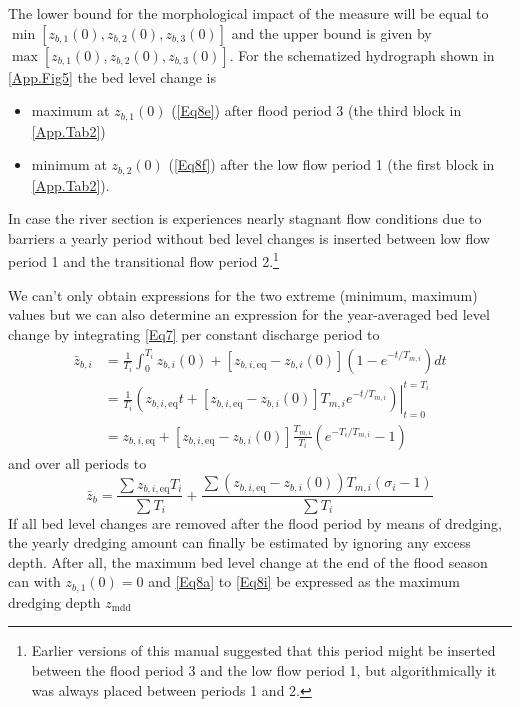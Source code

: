 The lower bound for the morphological impact of the measure will be equal to $\min[z_{b,1}(0), z_{b,2}(0), z_{b,3}(0)]$ and the upper bound is given by $\max[z_{b,1}(0), z_{b,2}(0), z_{b,3}(0)]$.
For the schematized hydrograph shown in \autoref{App.Fig5} the bed level change is

\begin{itemize}
\item maximum at $z_{b,1}(0)$ (\autoref{Eq8e}) after flood period 3 (the third block in \autoref{App.Tab2})
\item minimum at $z_{b,2}(0)$ (\autoref{Eq8f}) after the low flow period 1 (the first block in \autoref{App.Tab2}).
\end{itemize}

In case the river section is experiences nearly stagnant flow conditions due to barriers a yearly period without bed level changes is inserted between low flow period 1 and the transitional flow period 2.\footnote{Earlier versions of this manual suggested that this period might be inserted between the flood period 3 and the low flow period 1, but algorithmically it was always placed between periods 1 and 2.}

We can't only obtain expressions for the two extreme (minimum, maximum) values but we can also determine an expression for the year-averaged bed level change by integrating \autoref{Eq7} per constant discharge period to
%
\begin{align}
\bar{z}_{b,i} &= \frac{1}{T_i} \int_0^{T_i}{z_{b,i} (0) + [z_{b,i,\text{eq}} - z_{b,i}(0)](1 - e^{-t/T_{m,i}})}dt \\
&= \frac{1}{T_i} \left . \left ( {z_{b,i,\text{eq}} t + [z_{b,i,\text{eq}} - z_{b,i}(0)]T_{m,i} e^{-t/T_{m,i}}} \right ) \right |_{t=0}^{t=T_i} \\
&= z_{b,i,\text{eq}} + [z_{b,i,\text{eq}} - z_{b,i}(0)] \frac{T_{m,i}}{T_i} ( e^{-T_i/T_{m,i}} - 1 )
\end{align}
%
and over all periods to
%
\begin{equation}
\bar{z}_b = \frac{\sum{z_{b,i,\text{eq}} T_i}}{\sum{T_i}} + \frac{\sum{(z_{b,i,\text{eq}}-z_{b,i}(0)) T_{m,i} (\sigma_i-1)}}{\sum{T_i}}
\label{Eq8h}
\end{equation}
%
If all bed level changes are removed after the flood period by means of dredging, the yearly dredging amount can finally be estimated by ignoring any excess depth.
After all, the maximum bed level change at the end of the flood season can with $z_{b,1}(0) = 0$ and \autoref{Eq8a} to \autoref{Eq8i} be expressed as the maximum dredging depth $z_\text{mdd}$

